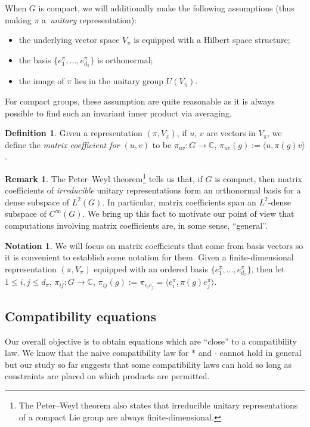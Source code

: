 \documentclass[10pt,a4paper]{amsart}
\numberwithin{equation}{section}
\theoremstyle{definition}
\newtheorem{Definition}[Theorem]{Definition}
\newtheorem{Remark}[Theorem]{Remark}
\newtheorem{notation}[Theorem]{Notation}
\begin{document}
When $ G $ is compact, we will additionally make the following assumptions (thus making $\pi$ a~\textit{unitary} representation):
\begin{itemize}\itemsep=0pt
  \item the underlying vector space $ V_\pi $ is equipped with a Hilbert space structure;
  \item the basis $ \{ e^{\pi}_1, \ldots, e^{\pi}_{d_\pi} \} $ is orthonormal;
  \item the image of $ \pi $ lies in the unitary group $ U(V_\pi) $.
\end{itemize}
For compact groups, these assumption are quite reasonable as it is always possible to find such an invariant inner product via averaging.
\begin{Definition} Given a representation $ (\pi, V_\pi) $, if $u$, $v$ are vectors in $V_\pi$, we define the \textit{matrix coefficient for $ (u,v) $} to be
$\pi_{uv} \colon G \to \mathbb{C}$, $\pi_{uv}(g) :=\langle u,\pi(g)v\rangle$.
\end{Definition}
\begin{Remark}
The Peter--Weyl theorem\footnote{The Peter--Weyl theorem also states that irreducible unitary representations of a compact Lie group are always finite-dimensional.} tells us that, if $ G $ is compact, then matrix coefficients of \emph{irreducible} unitary representations form an orthonormal basis for a dense subspace of $ L^2(G) $. In particular, matrix coefficients span an $ L^2$-dense subspace of $ C^\infty(G) $. We bring up this fact to motivate our point of view that computations involving matrix coefficients are, in some sense, ``general''.
\end{Remark}
\begin{notation}\label{Notation:matrix.coefficients}
We will focus on matrix coefficients that come from basis vectors so it is convenient to establish some notation for them. Given a finite-dimensional representation $ (\pi, V_\pi ) $ equipped with an ordered basis $ \{ e^\pi_1,\ldots, e^\pi_{d_{\pi}} \} $, then let
$1 \le i,j \le d_\pi$, $ \pi_{ij} \colon G \to \mathbb{C}$, $ \pi_{ij}(g):= \pi_{e_i e_j} = \langle e_i^{\pi},\pi(g)e_j^{\pi}\rangle$.
\end{notation}


\subsection{Compatibility equations}
Our overall objective is to obtain equations which are ``close'' to a compatibility law. We know that the naive compatibility law for $ * $ and $ \cdot $ cannot hold in general but our study so far suggests that some compatibility laws can hold so long as constraints are placed on which products are permitted.
\end{document}
